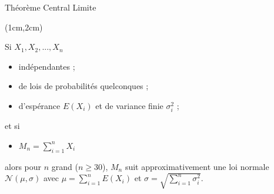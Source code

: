 \documentclass{beamer}
\begin{document}
\begin{frame}{Théorème Central Limite}
\begin{textblock*}{\textwidth}(1cm,2cm)

Si $X_1, X_2, ..., X_n$ 
\begin{itemize}
\item indépendantes ;
\item de lois de probabilités quelconques ;
\item  d'espérance $E(X_i)$ et de variance finie $\sigma_i^2$ ;
\end{itemize}

et si 
\begin{itemize}
\item $M_n=\sum\limits_{i=1}^n X_i$
\end{itemize}
alors pour $n$ grand ($n\geq 30$), $M_n$ suit approximativement
une loi normale $\mathcal{N}(\mu,\sigma)$ avec $\mu = \sum\limits_{i=1}^n E(X_i)$ et
$\sigma = \sqrt{\sum\limits_{i=1}^n \sigma_i^2}$. 


\end{textblock*}

\end{frame} 
 



\end{document}

